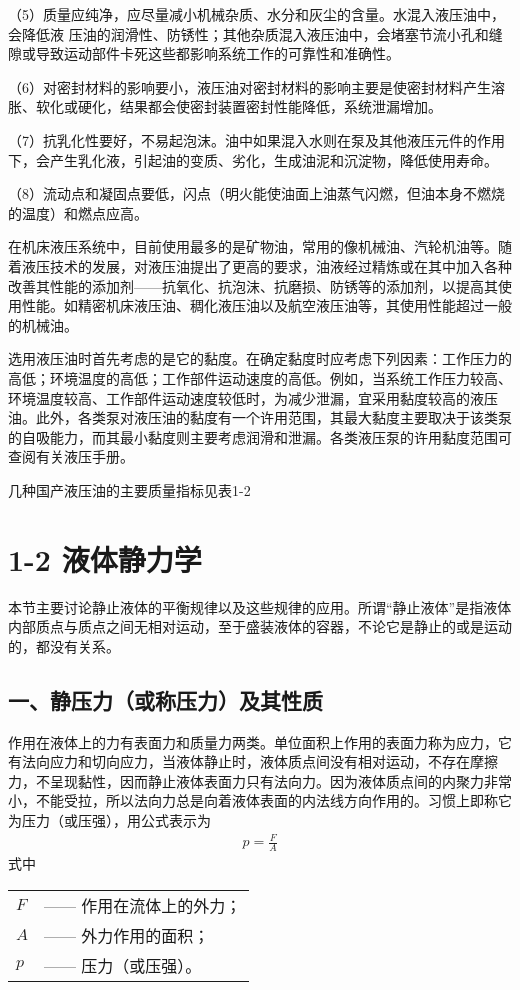 （5）质量应纯净，应尽量减小机械杂质、水分和灰尘的含量。水混入液压油中，会降低液
\newpage
压油的润滑性、防锈性；其他杂质混入液压油中，会堵塞节流小孔和缝隙或导致运动部件卡死这些都影响系统工作的可靠性和准确性。

（6）对密封材料的影响要小，液压油对密封材料的影响主要是使密封材料产生溶胀、软化或硬化，结果都会使密封装置密封性能降低，系统泄漏增加。

（7）抗乳化性要好，不易起泡沫。油中如果混入水则在泵及其他液压元件的作用下，会产生乳化液，引起油的变质、劣化，生成油泥和沉淀物，降低使用寿命。
        
（8）流动点和凝固点要低，闪点（明火能使油面上油蒸气闪燃，但油本身不燃烧的温度）和燃点应高。

 在机床液压系统中，目前使用最多的是矿物油，常用的像机械油、汽轮机油等。随着液压技术的发展，对液压油提出了更高的要求，油液经过精炼或在其中加入各种改善其性能的添加剂——抗氧化、抗泡沫、抗磨损、防锈等的添加剂，以提高其使用性能。如精密机床液压油、稠化液压油以及航空液压油等，其使用性能超过一般的机械油。
         
选用液压油时首先考虑的是它的黏度。在确定黏度时应考虑下列因素：工作压力的高低；环境温度的高低；工作部件运动速度的高低。例如，当系统工作压力较高、环境温度较高、工作部件运动速度较低时，为减少泄漏，宜采用黏度较高的液压油。此外，各类泵对液压油的黏度有一个许用范围，其最大黏度主要取决于该类泵的自吸能力，而其最小黏度则主要考虑润滑和泄漏。各类液压泵的许用黏度范围可查阅有关液压手册。

几种国产液压油的主要质量指标见表1-2


   \newpage    
   \chapter*{1-2 液体静力学}    
   
   本节主要讨论静止液体的平衡规律以及这些规律的应用。所谓“静止液体”是指液体内部质点与质点之间无相对运动，至于盛装液体的容器，不论它是静止的或是运动的，都没有关系。
   \section*{一、静压力（或称压力）及其性质}
         作用在液体上的力有表面力和质量力两类。单位面积上作用的表面力称为应力，它有法向应力和切向应力，当液体静止时，液体质点间没有相对运动，不存在摩擦力，不呈现黏性，因而静止液体表面力只有法向力。因为液体质点间的内聚力非常小，不能受拉，所以法向力总是向着液体表面的内法线方向作用的。习惯上即称它为压力（或压强），用公式表示为
         \begin{gather}
            {p}={\frac{F}{A}}
        \end{gather}
\noindent 式中\ 
\begin{tabular}[t]{ll}
    $F$ & —— 作用在流体上的外力；\\
    $A$ & —— 外力作用的面积；\\
    $p$ & —— 压力（或压强）。 
   
\end{tabular}

